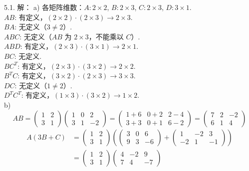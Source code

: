 \begin{exer}
\vspace{5ex}


5.1. 解：
a)
各矩阵维数：$A: 2 \times 2$, $B: 2 \times 3$, $C: 2 \times 3$, $D: 3 \times 1$.
\\
$AB$: 有定义，$(2 \times 2) \cdot (2 \times 3) \to 2 \times 3$.\\
$BA$: 无定义（$3 \neq 2$）.\\
$ABC$: 无定义（$AB$ 为 $2 \times 3$，不能乘以 $C$）.\\
$ABD$: 有定义，$(2 \times 3) \cdot (3 \times 1) \to 2 \times 1$.\\
$BC$: 无定义.\\
$BC^T$: 有定义，$(2 \times 3) \cdot (3 \times 2) \to 2 \times 2$.\\
$B^T C$: 有定义，$(3 \times 2) \cdot (2 \times 3) \to 3 \times 3$.\\
$DC$: 无定义（$1 \neq 2$）.\\
$D^T C^T$: 有定义，$(1 \times 3) \cdot (3 \times 2) \to 1 \times 2$.
\\
b)
$$ AB = \begin{pmatrix} 1 & 2 \\ 3 & 1 \end{pmatrix} \begin{pmatrix} 1 & 0 & 2 \\ 3 & 1 & -2 \end{pmatrix} = \begin{pmatrix} 1+6 & 0+2 & 2-4 \\ 3+3 & 0+1 & 6-2 \end{pmatrix} = \begin{pmatrix} 7 & 2 & -2 \\ 6 & 1 & 4 \end{pmatrix} $$
$$
\begin{aligned}
A(3B + C) &= \begin{pmatrix} 1 & 2 \\ 3 & 1 \end{pmatrix} \left( \begin{pmatrix} 3 & 0 & 6 \\ 9 & 3 & -6 \end{pmatrix} + \begin{pmatrix} 1 & -2 & 3 \\ -2 & 1 & -1 \end{pmatrix} \right) \\
&= \begin{pmatrix} 1 & 2 \\ 3 & 1 \end{pmatrix} \begin{pmatrix} 4 & -2 & 9 \\ 7 & 4 & -7 \end{pmatrix} \\

\end{aligned}$$
\end{exer}
